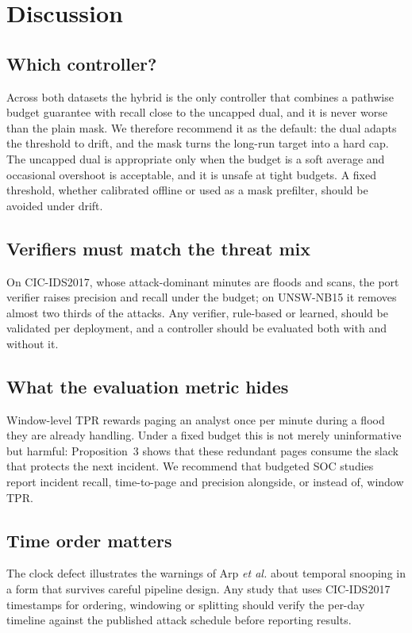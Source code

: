 \documentclass[journal,10pt,twocolumn]{IEEEtran}
\begin{document}
\section{Discussion}
\subsection{Which controller?}
Across both datasets the hybrid is the only controller that combines a pathwise budget guarantee with recall close to the uncapped dual, and it is never worse than the plain mask. We therefore recommend it as the default: the dual adapts the threshold to drift, and the mask turns the long-run target into a hard cap. The uncapped dual is appropriate only when the budget is a soft average and occasional overshoot is acceptable, and it is unsafe at tight budgets. A fixed threshold, whether calibrated offline or used as a mask prefilter, should be avoided under drift.

\subsection{Verifiers must match the threat mix}
On CIC-IDS2017, whose attack-dominant minutes are floods and scans, the port verifier raises precision and recall under the budget; on UNSW-NB15 it removes almost two thirds of the attacks. Any verifier, rule-based or learned, should be validated per deployment, and a controller should be evaluated both with and without it.

\subsection{What the evaluation metric hides}
Window-level TPR rewards paging an analyst once per minute during a flood they are already handling. Under a fixed budget this is not merely uninformative but harmful: Proposition~3 shows that these redundant pages consume the slack that protects the next incident. We recommend that budgeted SOC studies report incident recall, time-to-page and precision alongside, or instead of, window TPR.

\subsection{Time order matters}
The clock defect illustrates the warnings of Arp \emph{et al.} \cite{arp2022dos} about temporal snooping in a form that survives careful pipeline design. Any study that uses CIC-IDS2017 timestamps for ordering, windowing or splitting should verify the per-day timeline against the published attack schedule before reporting results.
\end{document}
